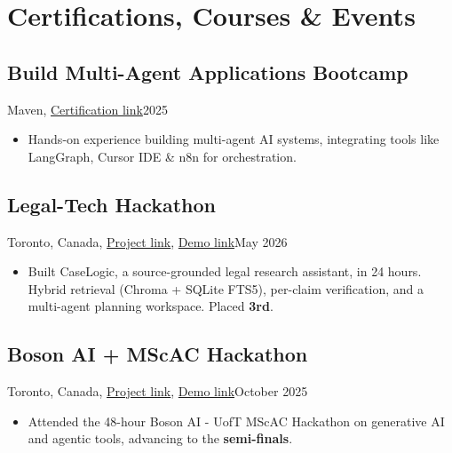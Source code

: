 \section{Certifications, Courses \& Events}
\subsection{Build Multi-Agent Applications Bootcamp}{Maven, \href{https://maven.com/wrap-up/420fc434}{Certification link}}{2025}
\begin{itemize}
    \item Hands-on experience building multi-agent AI systems, integrating tools like LangGraph, Cursor IDE \& n8n for orchestration.
\end{itemize}

\subsection{Legal-Tech Hackathon}{Toronto, Canada, \href{https://github.com/Danial-Kord/CaseLogic}{Project link}, \href{https://youtu.be/7VE8Qm21KM8}{Demo link}}{May 2026}
\begin{itemize}
    \item Built CaseLogic, a source-grounded legal research assistant, in 24 hours. Hybrid retrieval (Chroma + SQLite FTS5), per-claim verification, and a multi-agent planning workspace. Placed \textbf{3rd}.
\end{itemize}


\subsection{Boson AI + MScAC Hackathon}{Toronto, Canada, \href{https://github.com/setareh-soltanieh/SAFEZone_AI}{Project link}, \href{https://drive.google.com/file/d/1CqxBj3Go6H3Opm6P-1mPiUsH8TcX5OJI/view?usp=sharing}{Demo link}}{October 2025}
\begin{itemize}
    \item Attended the 48-hour Boson AI - UofT MScAC Hackathon on generative AI and agentic tools, advancing to the \textbf{semi-finals}.
\end{itemize}


